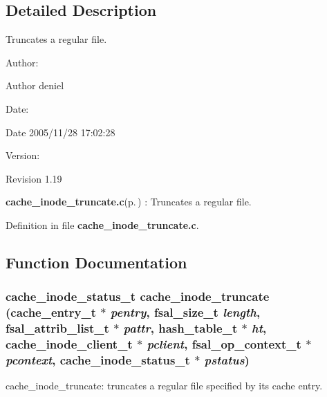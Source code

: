 \subsection{Detailed Description}
Truncates a regular file. 

\begin{Desc}
\item[Author:]\begin{Desc}
\item[Author]deniel \end{Desc}
\end{Desc}
\begin{Desc}
\item[Date:]\begin{Desc}
\item[Date]2005/11/28 17:02:28 \end{Desc}
\end{Desc}
\begin{Desc}
\item[Version:]\begin{Desc}
\item[Revision]1.19 \end{Desc}
\end{Desc}
{\bf cache\_\-inode\_\-truncate.c}{\rm (p.\,\pageref{cache__inode__truncate_8c})} : Truncates a regular file.

Definition in file {\bf cache\_\-inode\_\-truncate.c}.

\subsection{Function Documentation}
\subsubsection{\setlength{\rightskip}{0pt plus 5cm}cache\_\-inode\_\-status\_\-t cache\_\-inode\_\-truncate (cache\_\-entry\_\-t $\ast$ {\em pentry}, fsal\_\-size\_\-t {\em length}, fsal\_\-attrib\_\-list\_\-t $\ast$ {\em pattr}, hash\_\-table\_\-t $\ast$ {\em ht}, cache\_\-inode\_\-client\_\-t $\ast$ {\em pclient}, fsal\_\-op\_\-context\_\-t $\ast$ {\em pcontext}, cache\_\-inode\_\-status\_\-t $\ast$ {\em pstatus})}\label{cache__inode__truncate_8c_a2}


cache\_\-inode\_\-truncate: truncates a regular file specified by its cache entry.

